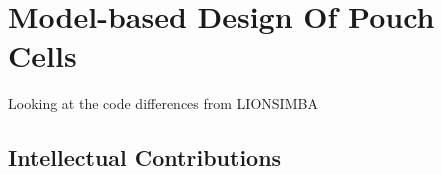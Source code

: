 
\graphicspath{{3/figures/}}

\chapter{Model-based Design Of Pouch Cells}\label{ch:modelbaseddesign}
\startcontents[chapters]

\bigskip
Looking at the code differences from LIONSIMBA


\section*{Intellectual Contributions}
